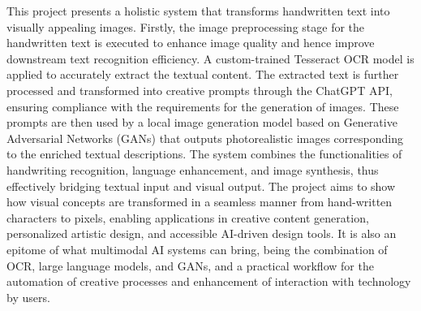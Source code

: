 
This project presents a holistic system that transforms handwritten text into visually appealing images. Firstly, the image preprocessing stage for the handwritten text is executed to enhance image quality and hence improve downstream text recognition efficiency. A custom-trained Tesseract OCR model is applied to accurately extract the textual content. The extracted text is further processed and transformed into creative prompts through the ChatGPT API, ensuring compliance with the requirements for the generation of images. These prompts are then used by a local image generation model based on Generative Adversarial Networks (GANs) that outputs photorealistic images corresponding to the enriched textual descriptions. The system combines the functionalities of handwriting recognition, language enhancement, and image synthesis, thus effectively bridging textual input and visual output. The project aims to show how visual concepts are transformed in a seamless manner from hand-written characters to pixels, enabling applications in creative content generation, personalized artistic design, and accessible AI-driven design tools. It is also an epitome of what multimodal AI systems can bring, being the combination of OCR, large language models, and GANs, and a practical workflow for the automation of creative processes and enhancement of interaction with technology by users.
